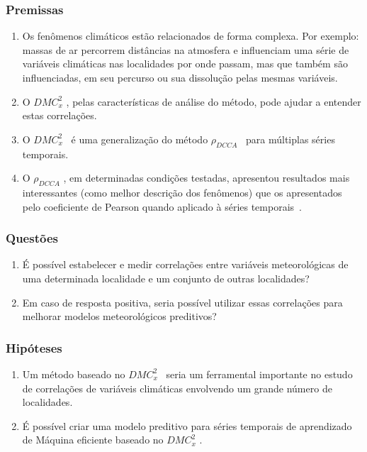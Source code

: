 \documentclass[11pt, aspectratio=169]{beamer}
\newcommand{\dmc}{\(DMC_x^2\) }
\newcommand{\pdcca}{\({\rho}_{DCCA}\) }
\begin{document}
\begin{frame}
  \frametitle{Premissas}

  \begin{enumerate}
    \label{enum:premissas}
    \item Os fenômenos climáticos estão relacionados de forma complexa. Por exemplo: massas de ar percorrem distâncias na atmosfera e influenciam uma série de variáveis climáticas nas localidades por onde passam, mas que também são influenciadas, em seu percurso ou sua dissolução pelas mesmas variáveis.
    \item O \dmc, pelas características de análise do método, pode ajudar a entender estas correlações.
    \item O \dmc~é uma generalização do método \pdcca~para múltiplas séries temporais.
    \item O \pdcca, em determinadas condições testadas, apresentou resultados mais interessantes (como melhor descrição dos fenômenos) que os apresentados pelo coeficiente de Pearson quando aplicado à séries temporais~\cite{Wang2013}.
  \end{enumerate}

\end{frame}

\begin{frame}
  \frametitle{Questões}

  \begin{enumerate}
    \label{enum:quest}

    \item É possível estabelecer e medir correlações entre variáveis meteorológicas de uma determinada localidade e um conjunto de outras localidades?

    \item Em caso de resposta positiva, seria possível utilizar essas correlações para melhorar modelos meteorológicos preditivos?
  \end{enumerate}

\end{frame}

\begin{frame}
  \frametitle{Hipóteses}

  \begin{enumerate}
    \item Um método baseado no \dmc~seria um ferramental importante no estudo de correlações de variáveis climáticas envolvendo um grande número de localidades.
    \item É possível criar uma modelo preditivo para séries temporais de aprendizado de Máquina eficiente baseado no \dmc.
  \end{enumerate}

\end{frame}
\end{document}

